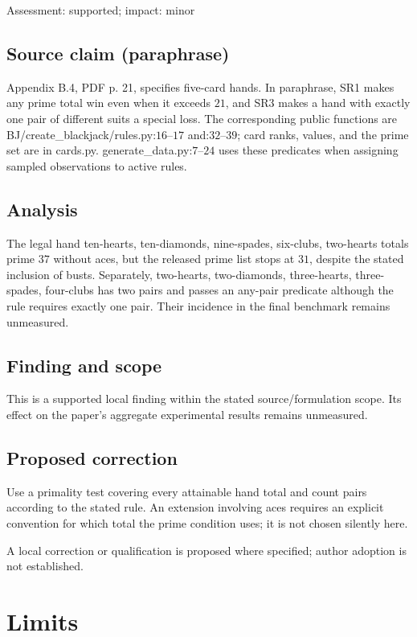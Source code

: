 \documentclass[11pt]{article}
\begin{document}
Assessment: supported; impact: minor

\subsection*{Source claim (paraphrase)}

Appendix B.4, PDF p. 21, specifies five-card hands. In paraphrase, SR1 makes any prime total win even when it exceeds \(21\), and SR3 makes a hand with exactly one pair of different suits a special loss. The corresponding public functions are BJ/create\_blackjack/rules.py:\(16\)–\(17\) and:\(32\)–\(39\); card ranks, values, and the prime set are in cards.py. generate\_data.py:\(7\)–\(24\) uses these predicates when assigning sampled observations to active rules.

\subsection*{Analysis}

The legal hand ten-hearts, ten-diamonds, nine-spades, six-clubs, two-hearts totals prime \(37\) without aces, but the released prime list stops at \(31\), despite the stated inclusion of busts. Separately, two-hearts, two-diamonds, three-hearts, three-spades, four-clubs has two pairs and passes an any-pair predicate although the rule requires exactly one pair. Their incidence in the final benchmark remains unmeasured.

\subsection*{Finding and scope}

This is a supported local finding within the stated source/formulation scope. Its effect on the paper's aggregate experimental results remains unmeasured.

\subsection*{Proposed correction}

Use a primality test covering every attainable hand total and count pairs according to the stated rule. An extension involving aces requires an explicit convention for which total the prime condition uses; it is not chosen silently here.

A local correction or qualification is proposed where specified; author adoption is not established.

\section*{Limits}
\end{document}
